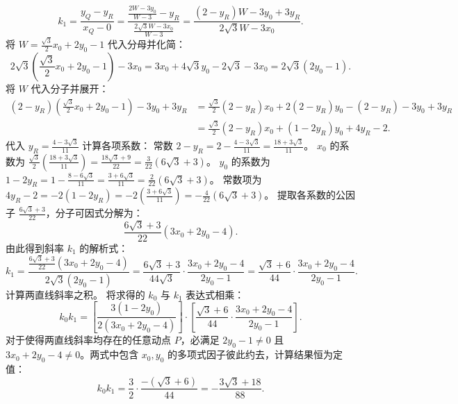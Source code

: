 \begin{solution}
\[ k_1 = \frac{y_Q - y_R}{x_Q - 0} = \frac{\frac{2 W - 3 y_0}{W - 3} - y_R}{\frac{2\sqrt{3} W - 3 x_0}{W - 3}} = \frac{(2 - y_R) W - 3 y_0 + 3 y_R}{2\sqrt{3} W - 3 x_0}. \]
将 $W = \frac{\sqrt{3}}{2} x_0 + 2 y_0 - 1$ 代入分母并化简：
\[ 2\sqrt{3} \left(\frac{\sqrt{3}}{2} x_0 + 2 y_0 - 1\right) - 3 x_0 = 3 x_0 + 4\sqrt{3} y_0 - 2\sqrt{3} - 3 x_0 = 2\sqrt{3}(2 y_0 - 1). \]
将 $W$ 代入分子并展开：
\begin{align*}
(2 - y_R) \left(\frac{\sqrt{3}}{2} x_0 + 2 y_0 - 1\right) - 3 y_0 + 3 y_R &= \frac{\sqrt{3}}{2} (2 - y_R) x_0 + 2(2 - y_R) y_0 - (2 - y_R) - 3 y_0 + 3 y_R \\
&= \frac{\sqrt{3}}{2} (2 - y_R) x_0 + (1 - 2 y_R) y_0 + 4 y_R - 2.
\end{align*}
代入 $y_R = \frac{4 - 3\sqrt{3}}{11}$ 计算各项系数：
常数 $2 - y_R = 2 - \frac{4 - 3\sqrt{3}}{11} = \frac{18 + 3\sqrt{3}}{11}$。
$x_0$ 的系数为 $\frac{\sqrt{3}}{2} \left( \frac{18 + 3\sqrt{3}}{11} \right) = \frac{18\sqrt{3} + 9}{22} = \frac{3}{22} (6\sqrt{3} + 3)$。
$y_0$ 的系数为 $1 - 2 y_R = 1 - \frac{8 - 6\sqrt{3}}{11} = \frac{3 + 6\sqrt{3}}{11} = \frac{2}{22} (6\sqrt{3} + 3)$。
常数项为 $4 y_R - 2 = -2(1 - 2 y_R) = -2 \left( \frac{3 + 6\sqrt{3}}{11} \right) = -\frac{4}{22} (6\sqrt{3} + 3)$。
提取各系数的公因子 $\frac{6\sqrt{3} + 3}{22}$，分子可因式分解为：
\[ \frac{6\sqrt{3} + 3}{22} (3 x_0 + 2 y_0 - 4). \]
由此得到斜率 $k_1$ 的解析式：
\[ k_1 = \frac{\frac{6\sqrt{3} + 3}{22} (3 x_0 + 2 y_0 - 4)}{2\sqrt{3}(2 y_0 - 1)} = \frac{6\sqrt{3} + 3}{44\sqrt{3}} \cdot \frac{3 x_0 + 2 y_0 - 4}{2 y_0 - 1} = \frac{\sqrt{3} + 6}{44} \cdot \frac{3 x_0 + 2 y_0 - 4}{2 y_0 - 1}. \]
计算两直线斜率之积。
将求得的 $k_0$ 与 $k_1$ 表达式相乘：
\[ k_0 k_1 = \left[ \frac{3(1 - 2 y_0)}{2(3 x_0 + 2 y_0 - 4)} \right] \cdot \left[ \frac{\sqrt{3} + 6}{44} \cdot \frac{3 x_0 + 2 y_0 - 4}{2 y_0 - 1} \right]. \]
对于使得两直线斜率均存在的任意动点 $P$，必满足 $2 y_0 - 1 \neq 0$ 且 $3 x_0 + 2 y_0 - 4 \neq 0$。两式中包含 $x_0, y_0$ 的多项式因子彼此约去，计算结果恒为定值：
\[ k_0 k_1 = \frac{3}{2} \cdot \frac{-(\sqrt{3} + 6)}{44} = -\frac{3\sqrt{3} + 18}{88}. \]

\end{solution}



